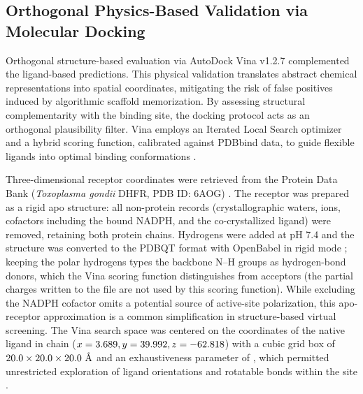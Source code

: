 
\subsection{Orthogonal Physics-Based Validation via Molecular Docking}

Orthogonal structure-based evaluation via AutoDock Vina v1.2.7 \cite{rajesh2026, trott2009} complemented the ligand-based predictions. This physical validation translates abstract chemical representations into spatial coordinates, mitigating the risk of false positives induced by algorithmic scaffold memorization. By assessing structural complementarity with the binding site, the docking protocol acts as an orthogonal plausibility filter. Vina employs an Iterated Local Search optimizer and a hybrid scoring function, calibrated against PDBbind data, to guide flexible ligands into optimal binding conformations \cite{eberhardt2021}.

Three-dimensional receptor coordinates were retrieved from the Protein Data Bank (\textit{Toxoplasma gondii} DHFR, PDB ID: 6AOG) \cite{consortium2019, berman2003}. The receptor was prepared as a rigid apo structure: all non-protein records (crystallographic waters, ions, cofactors including the bound NADPH, and the co-crystallized ligand) were removed, retaining both protein chains. Hydrogens were added at pH 7.4 and the structure was converted to the PDBQT format with OpenBabel in rigid mode \cite{babel2011}; keeping the polar hydrogens types the backbone N--H groups as hydrogen-bond donors, which the Vina scoring function distinguishes from acceptors (the partial charges written to the file are not used by this scoring function). While excluding the NADPH cofactor omits a potential source of active-site polarization, this apo-receptor approximation is a common simplification in structure-based virtual screening. The Vina search space was centered on the coordinates of the native \RedockLigand{} ligand in chain \RedockChain{} ($x = 3.689{}, y = 39.992{}, z = -62.818$) with a cubic grid box of $20.0{} \times 20.0{} \times 20.0{}\text{ \AA}$ and an exhaustiveness parameter of \DockExhaustiveness{}, which permitted unrestricted exploration of ligand orientations and rotatable bonds within the site \cite{trott2009}.

